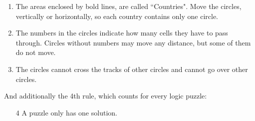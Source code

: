 \begin{enumerate}
  \item The areas enclosed by bold lines, are called ``Countries". Move the circles, vertically or horizontally, so each country contains only one circle.
  \item The numbers in the circles indicate how many cells they have to pass through. Circles without numbers may move any distance, but some of them do not move.
  \item The circles cannot cross the tracks of other circles and cannot go over other circles. 
\end{enumerate}
And additionally the 4th rule, which counts for every logic puzzle:
\begin{enumerate}
  \item[4] A puzzle only has one solution.
\end{enumerate}

